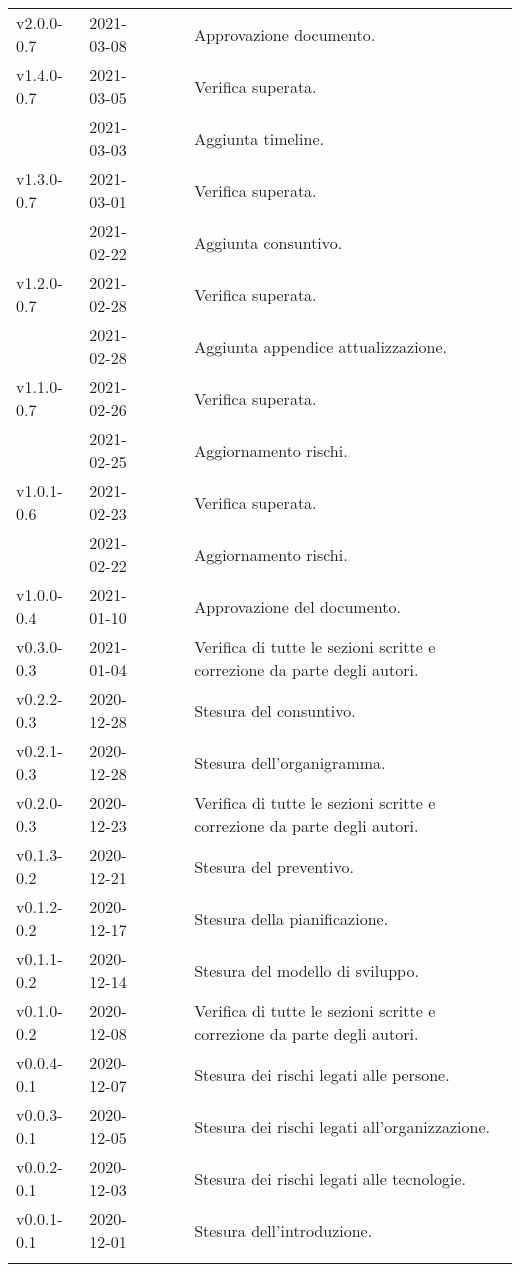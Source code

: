 {\begin{longtable}{C{.131777\freewidth} C{.134036\freewidth} C{.263554\freewidth} C{.188254\freewidth} C{.282379\freewidth}}
		v2.0.0-0.7 & 2021-03-08 & \Matteo{} & \RdP{} & Approvazione documento. \\
		v1.4.0-0.7 & 2021-03-05 & \Davide{} & \ver{} & Verifica superata. \\
		& 2021-03-03 & \Daniele{} & \ana{} & Aggiunta timeline. \\
		v1.3.0-0.7 & 2021-03-01 & \Giosue{} & \ver{} & Verifica superata. \\
		& 2021-02-22 & \Daniele{} & \ana{} & Aggiunta consuntivo. \\
		v1.2.0-0.7 & 2021-02-28 & \Davide{} & \ana{} & Verifica superata. \\
		& 2021-02-28 & \Lucrezia{} & \ana{} & Aggiunta appendice attualizzazione. \\
		v1.1.0-0.7 & 2021-02-26 & \Giosue{} & \ver{} & Verifica superata. \\
		 & 2021-02-25 & \Lucrezia{} & \ana{} & Aggiornamento rischi. \\
		v1.0.1-0.6 & 2021-02-23 & \Davide{} & \ver{} & Verifica superata. \\
		& 2021-02-22 & \Daniele{} & \ana{} & Aggiornamento rischi. \\
		v1.0.0-0.4 & 2021-01-10 & \Daniele{} & \RdP{} & Approvazione del documento. \\
		v0.3.0-0.3 & 2021-01-04 & \Lucrezia{} & \ver{} & Verifica di tutte le sezioni scritte e correzione da parte degli autori. \\

		v0.2.2-0.3 & 2020-12-28 & \Tommaso{} & \ana{} & Stesura del consuntivo. \\
		v0.2.1-0.3 & 2020-12-28 & \Matteo{} & \ana{} & Stesura dell'organigramma. \\

		v0.2.0-0.3 & 2020-12-23 & \Giosue{} & \ver{} & Verifica di tutte le sezioni scritte e correzione da parte degli autori. \\
		v0.1.3-0.2 & 2020-12-21 & \Tommaso{} & \ana{} & Stesura del preventivo. \\
		v0.1.2-0.2 & 2020-12-17 & \Tommaso{} & \ana{} & Stesura della pianificazione. \\
		v0.1.1-0.2 & 2020-12-14 & \Matteo{} & \ana{} & Stesura del modello di sviluppo. \\

		v0.1.0-0.2 & 2020-12-08 & \Davide & \ver{} & Verifica di tutte le sezioni scritte e correzione da parte degli autori. \\
		v0.0.4-0.1 & 2020-12-07 & \Matteo{} & \ana{} & Stesura dei rischi legati alle persone. \\
		v0.0.3-0.1 & 2020-12-05 & \Matteo{} & \ana{} & Stesura dei rischi legati all'organizzazione. \\
		v0.0.2-0.1 & 2020-12-03 & \Matteo{} & \ana{} & Stesura dei rischi legati alle tecnologie. \\
		v0.0.1-0.1 & 2020-12-01 & \Tommaso{} & \ana{} & Stesura dell'introduzione. \\
		
		\bottomrule
		\hiderowcolors
	\end{longtable}
}
